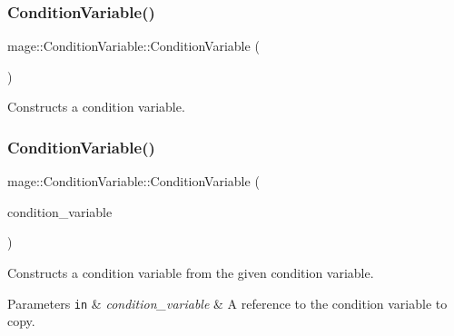 \subsubsection{\texorpdfstring{Condition\+Variable()}{ConditionVariable()}\hspace{0.1cm}{\footnotesize\ttfamily [1/3]}}
{\footnotesize\ttfamily mage\+::\+Condition\+Variable\+::\+Condition\+Variable (\begin{DoxyParamCaption}{ }\end{DoxyParamCaption})\hspace{0.3cm}{\ttfamily [noexcept]}}

Constructs a condition variable. \hypertarget{classmage_1_1_condition_variable_add5ccf5807a94588c28621141df334d3}{}\label{classmage_1_1_condition_variable_add5ccf5807a94588c28621141df334d3} 
\subsubsection{\texorpdfstring{Condition\+Variable()}{ConditionVariable()}\hspace{0.1cm}{\footnotesize\ttfamily [2/3]}}
{\footnotesize\ttfamily mage\+::\+Condition\+Variable\+::\+Condition\+Variable (\begin{DoxyParamCaption}\item[{const \hyperlink{classmage_1_1_condition_variable}{Condition\+Variable} \&}]{condition\+\_\+variable }\end{DoxyParamCaption})\hspace{0.3cm}{\ttfamily [delete]}}

Constructs a condition variable from the given condition variable.


\begin{DoxyParams}[1]{Parameters}
\mbox{\tt in}  & {\em condition\+\_\+variable} & A reference to the condition variable to copy. \\
\hline
\end{DoxyParams}
\hypertarget{classmage_1_1_condition_variable_af9e62cadb0e6bc1c6473ffb1552bd6b2}{}\label{classmage_1_1_condition_variable_af9e62cadb0e6bc1c6473ffb1552bd6b2} 
